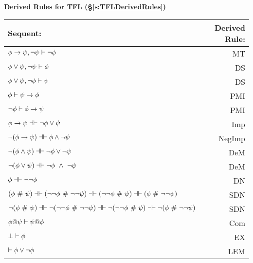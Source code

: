 \vspace{1em}
\begin{center}
\textbf{\Large Derived Rules for TFL (\S \ref{s:TFLDerivedRules})}
\end{center}


\begin{center}
\begin{tabular}{l  r}
\textbf{Sequent:}                    &       \textbf{Derived Rule:} \\ \hline
$\mathcal{\phi} \rightarrow \mathcal{\psi},  \neg\mathcal{\psi} \vdash \neg \mathcal{\phi}$   &                       MT  \\
$\mathcal{\phi} \vee \mathcal{\psi},  \neg\mathcal{\psi} \vdash \mathcal{\phi}$ & DS\\
$\mathcal{\phi} \vee \mathcal{\psi},  \neg\mathcal{\phi}\vdash \mathcal{\psi}$    &      DS  \\
$\mathcal{\phi} \vdash\mathcal{\psi} \rightarrow \mathcal{\phi}$  &              PMI  \\
$\neg\mathcal{\phi}\vdash\mathcal{\phi}\rightarrow \mathcal{\psi}$  & PMI\\
$\meta{\phi} \rightarrow\meta{\psi} \pequiv \enot\meta{\phi}\eor \meta{\psi}$  &                   Imp   \\
$\enot (\meta{\phi} \rightarrow \meta{\psi}) \pequiv \meta{\phi} \eand \enot \meta{\psi}$  &               NegImp  \\
$\enot (\meta{\phi} \eand \meta{\psi})  \pequiv \enot\meta{\phi}\eor \enot \meta{\psi}$  &                DeM  \\
$\enot (\meta{\phi} \eor \meta{\psi}) \pequiv \enot\meta{\phi}\ \eand \ \enot \meta{\psi}$   &               DeM  \\
$\meta{\phi} \pequiv \enot \enot \meta{\phi}$     &                              DN  \\
$(\meta{\phi}  \ \#\  \meta{\psi}) \pequiv (\enot \enot \meta{\phi}  \ \#\   \enot \enot \meta{\psi}) \pequiv (\enot \enot \meta{\phi}  \ \#\  \meta{\psi}) \pequiv (\meta{\phi}  \ \#\  \enot \enot  \meta{\psi})$ & SDN\\
$\enot (\meta{\phi}  \ \#\  \meta{\psi}) \pequiv \enot (\enot \enot \meta{\phi}  \ \#\   \enot \enot \meta{\psi}) \pequiv \enot (\enot \enot \meta{\phi}  \ \#\  \meta{\psi}) \pequiv \enot (\meta{\phi}  \ \#\  \enot \enot  \meta{\psi})$ & SDN\\
$\mathcal{\phi} @ \mathcal{\psi}  \vdash  \mathcal{\psi} @ \mathcal{\phi}$ &                          Com \\
$\bot \vdash \mathcal{\phi}$ & EX \\
 $\vdash \mathcal{\phi}\vee \neg \mathcal{\phi}$ &                                                    LEM \\
\end{tabular}
\end{center}


